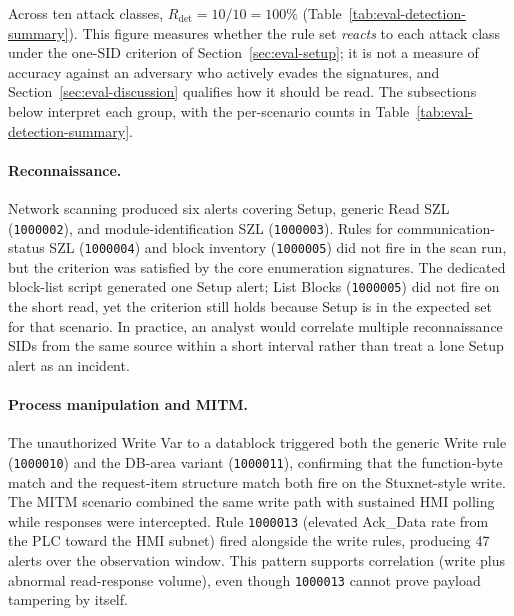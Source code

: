 \documentclass[../main.tex]{subfiles}
\begin{document}
Across ten attack classes, $R_{\mathrm{det}} = 10/10 = 100\%$ (Table~\ref{tab:eval-detection-summary}). This figure measures whether the rule set \emph{reacts} to each attack class under the one-SID criterion of Section~\ref{sec:eval-setup}; it is not a measure of accuracy against an adversary who actively evades the signatures, and Section~\ref{sec:eval-discussion} qualifies how it should be read. The subsections below interpret each group, with the per-scenario counts in Table~\ref{tab:eval-detection-summary}.

\paragraph{Reconnaissance.}
Network scanning produced six alerts covering Setup, generic Read SZL (\texttt{1000002}), and module-identification SZL (\texttt{1000003}). Rules for communication-status SZL (\texttt{1000004}) and block inventory (\texttt{1000005}) did not fire in the scan run, but the criterion was satisfied by the core enumeration signatures. The dedicated block-list script generated one Setup alert; List Blocks (\texttt{1000005}) did not fire on the short read, yet the criterion still holds because Setup is in the expected set for that scenario. In practice, an analyst would correlate multiple reconnaissance SIDs from the same source within a short interval rather than treat a lone Setup alert as an incident.

\paragraph{Process manipulation and MITM.}
The unauthorized Write Var to a datablock triggered both the generic Write rule (\texttt{1000010}) and the DB-area variant (\texttt{1000011}), confirming that the function-byte match and the request-item structure match both fire on the Stuxnet-style write. The MITM scenario combined the same write path with sustained HMI polling while responses were intercepted. Rule \texttt{1000013} (elevated Ack\_Data rate from the PLC toward the HMI subnet) fired alongside the write rules, producing 47 alerts over the observation window. This pattern supports correlation (write plus abnormal read-response volume), even though \texttt{1000013} cannot prove payload tampering by itself.
\end{document}
